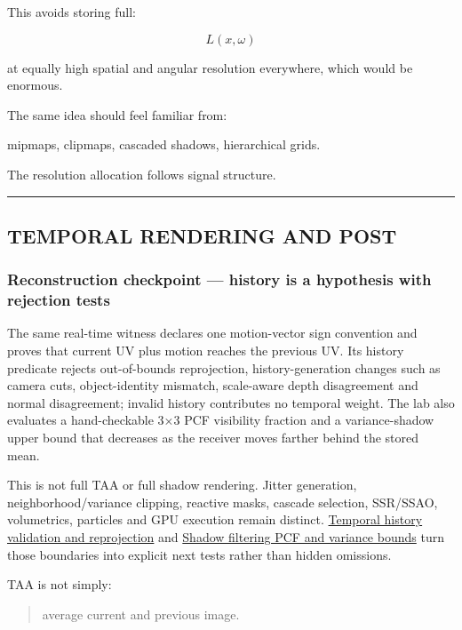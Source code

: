 This avoids storing full:

\[
L(x,\omega)
\]

at equally high spatial and angular resolution everywhere, which would be enormous.

The same idea should feel familiar from:

mipmaps, clipmaps, cascaded shadows, hierarchical grids.

The resolution allocation follows signal structure.

\begin{center}\rule{0.5\linewidth}{0.5pt}\end{center}

\subsection{TEMPORAL RENDERING AND POST}\label{04-visual-computing-ii-ch040-temporal-rendering-and-post}

\subsubsection{Reconstruction checkpoint --- history is a hypothesis with rejection tests}\label{04-visual-computing-ii-ch040-reconstruction-checkpoint-history-is-a-hypothesis-with-rejection-tests}

The same real-time witness declares one motion-vector sign convention and proves that current UV plus motion reaches the previous UV. Its history predicate rejects out-of-bounds reprojection, history-generation changes such as camera cuts, object-identity mismatch, scale-aware depth disagreement and normal disagreement; invalid history contributes no temporal weight. The lab also evaluates a hand-checkable 3×3 PCF visibility fraction and a variance-shadow upper bound that decreases as the receiver moves farther behind the stored mean.

This is not full TAA or full shadow rendering. Jitter generation, neighborhood/variance clipping, reactive masks, cascade selection, SSR/SSAO, volumetrics, particles and GPU execution remain distinct. \hyperref[appendix-e8c352e39466]{Temporal history validation and reprojection} and \hyperref[appendix-7cac8a689849]{Shadow filtering PCF and variance bounds} turn those boundaries into explicit next tests rather than hidden omissions.

TAA is not simply:

\begin{quote}
average current and previous image.
\end{quote}

